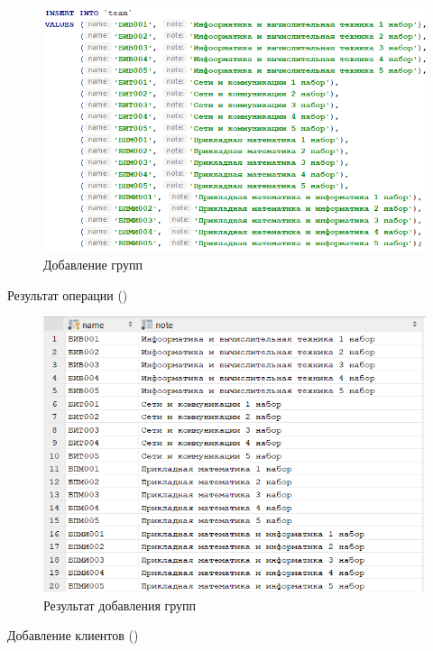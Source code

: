 \documentclass[a4paper,14pt]{article}
\begin{document}
	\begin{figure}[H]
		\centering		
		\includegraphics[width=\linewidth]{image/insertTeam}
		\caption{Добавление групп}\label{img:insertTeam}
	\end{figure} 
	
	Результат операции ()
	
	\begin{figure}[H]
		\centering		
		\includegraphics[width=\linewidth]{image/selectTeam}
		\caption{Результат добавления групп}\label{img:selectTeam}
	\end{figure} 

	Добавление клиентов ()
	
\end{document}
